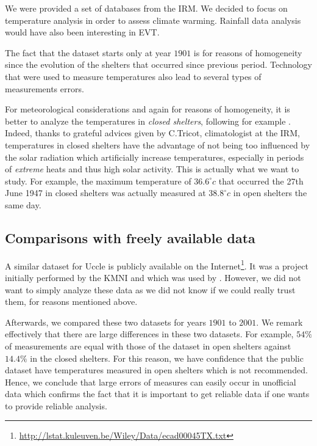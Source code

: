 We were provided a set of databases from the IRM. We decided to focus on temperature analysis in order to assess climate warming. Rainfall data analysis would have also been interesting in EVT. 

The fact that the dataset starts only at year $1901$ is for reasons of homogeneity since the evolution of the shelters that occurred since previous period. Technology that were used to measure temperatures also lead to several types of measurements errors.

For meteorological considerations and again for reasons of homogeneity, it is better to analyze the temperatures in \emph{closed shelters}, following for example \citet{lindsey_use_1956}. Indeed, thanks to grateful advices given by C.Tricot, climatologist at the IRM, temperatures in closed shelters have the advantage of not being too influenced by the solar radiation which artificially increase temperatures, especially in periods of \emph{extreme} heats and thus high solar activity. This is actually what we want to study. 
For example, the maximum temperature of $36.6^{\circ}c$ that occurred the 27th June 1947 in closed shelters was actually measured at $38.8^{\circ}c$ in open shelters the same day. 



\subsection*{Comparisons with freely available data} 

A similar dataset for Uccle is publicly available on the Internet\footnote{\url{http://lstat.kuleuven.be/Wiley/Data/ecad00045TX.txt}}. It was a project initially performed by the KMNI and which was used by \citet{beirlant_statistics_2006}. However, we did not want to simply analyze these data as we did not know if we could really trust them, for reasons mentioned above.

Afterwards, we compared these two datasets for years $1901$ to $2001$. We remark effectively that there are large differences
in these two datasets. For example,
$54\%$ of measurements are equal with those of the dataset in open shelters against $14.4\%$ in the closed shelters. For this reason, we have confidence that the public dataset have temperatures measured in open shelters which is not recommended. Hence, we conclude that large errors of measures can easily occur in unofficial data which confirms the fact that it is important to get reliable data if one wants to provide reliable analysis. 



